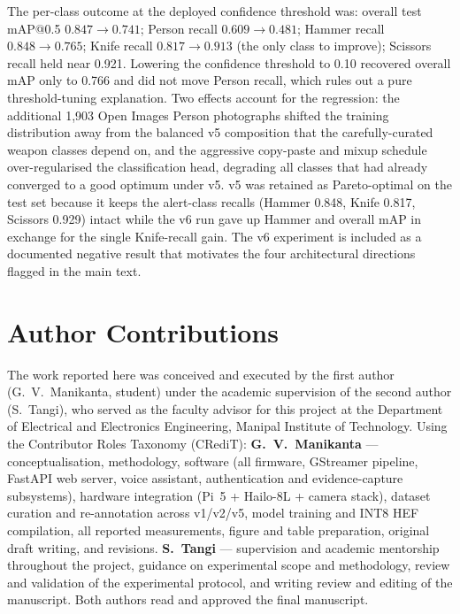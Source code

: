 \documentclass{ieeeaccess}
\begin{document}
The per-class outcome at the deployed confidence threshold was: overall test mAP{@}0.5 $0.847 \to 0.741$; Person recall $0.609 \to 0.481$; Hammer recall $0.848 \to 0.765$; Knife recall $0.817 \to 0.913$ (the only class to improve); Scissors recall held near 0.921. Lowering the confidence threshold to 0.10 recovered overall mAP only to 0.766 and did not move Person recall, which rules out a pure threshold-tuning explanation. Two effects account for the regression: the additional 1{,}903 Open Images Person photographs shifted the training distribution away from the balanced v5 composition that the carefully-curated weapon classes depend on, and the aggressive copy-paste and mixup schedule over-regularised the classification head, degrading all classes that had already converged to a good optimum under v5. v5 was retained as Pareto-optimal on the test set because it keeps the alert-class recalls (Hammer 0.848, Knife 0.817, Scissors 0.929) intact while the v6 run gave up Hammer and overall mAP in exchange for the single Knife-recall gain. The v6 experiment is included as a documented negative result that motivates the four architectural directions flagged in the main text.


\section*{Author Contributions}
\label{sec:contributions}
The work reported here was conceived and executed by the first author (G.~V.~Manikanta, student) under the academic supervision of the second author (S.~Tangi), who served as the faculty advisor for this project at the Department of Electrical and Electronics Engineering, Manipal Institute of Technology. Using the Contributor Roles Taxonomy (CRediT): \textbf{G.~V.~Manikanta} --- conceptualisation, methodology, software (all firmware, GStreamer pipeline, FastAPI web server, voice assistant, authentication and evidence-capture subsystems), hardware integration (Pi~5 + Hailo-8L + camera stack), dataset curation and re-annotation across v1/v2/v5, model training and INT8 HEF compilation, all reported measurements, figure and table preparation, original draft writing, and revisions. \textbf{S.~Tangi} --- supervision and academic mentorship throughout the project, guidance on experimental scope and methodology, review and validation of the experimental protocol, and writing review and editing of the manuscript. Both authors read and approved the final manuscript.
\end{document}
